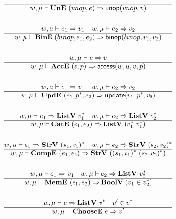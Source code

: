 \begin{gather*}
  \hline
  w, \mu \vdash \une ~ (unop, e) \Rightarrow \unop(unop, v) \\
%
\newline \\
  w, \mu \vdash e_1 \Rightarrow v_1 \quad w, \mu \vdash e_2 \Rightarrow v_2 \\
  \hline
  w, \mu \vdash \bine ~ (binop, e_1, e_2) \Rightarrow \binop(binop, v_1, v_2) \\
%
\newline \\
  w, \mu \vdash e \Rightarrow v \\
  \hline
  w, \mu \vdash \acce ~ (e, p) \Rightarrow \access(w, \mu, v, p) \\
%
\newline \\
  w, \mu \vdash e_1 \Rightarrow v_1 \quad w, \mu \vdash e_2 \Rightarrow v_2 \\
  \hline
  w, \mu \vdash \upde ~ (e_1, \seq p, e_2) \Rightarrow \update(v_1, \seq p, v_2) \\
%
\newline \\
   w, \mu \vdash e_1 \Rightarrow \listv ~ \seq{v_1} \quad
   w, \mu \vdash e_2 \Rightarrow \listv ~ \seq{v_2} \\
  \hline
  w, \mu \vdash \cate ~ (e_1, e_2) \Rightarrow \listv ~ (\seq{v_1} ~ \seq{v_1}) \\
%
\newline \\
   w, \mu \vdash e_1 \Rightarrow \strv ~ \seq{(s_1, v_1)} \quad
   w, \mu \vdash e_2 \Rightarrow \strv ~ \seq{(s_2, v_2)} \\
  \hline
  w, \mu \vdash \compe ~ (e_1, e_2) \Rightarrow \strv ~ (\seq{(s_1, v_1)} ~ \seq{(s_2, v_2)}) \\
%
\newline \\
  w, \mu \vdash e_1 \Rightarrow v_1 \quad
  w, \mu \vdash e_2 \Rightarrow \listv ~ \seq{v_2} \\
  \hline
  w, \mu \vdash \meme ~ (e_1, e_2) \Rightarrow \boolv ~ (v_1 \in \seq{v_2}) \\
%
\newline \\
  w, \mu \vdash e \Rightarrow \listv ~ \seq{v} \quad
  v' \in \seq{v} \\
  \hline
  w, \mu \vdash \choosee ~ e \Rightarrow v' \\
%
\newline \\

\end{gather*}
